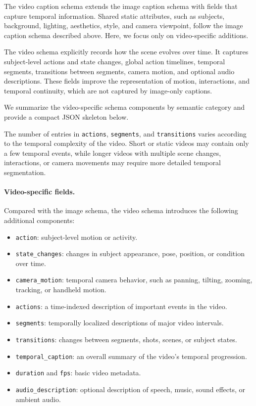 The video caption schema extends the image caption schema with fields that capture temporal information. Shared static attributes, such as subjects, background, lighting, aesthetics, style, and camera viewpoint, follow the image caption schema described above. Here, we focus only on video-specific additions.

The video schema explicitly records how the scene evolves over time. It captures subject-level actions and state changes, global action timelines, temporal segments, transitions between segments, camera motion, and optional audio descriptions. These fields improve the representation of motion, interactions, and temporal continuity, which are not captured by image-only captions.

We summarize the video-specific schema components by semantic category and provide a compact JSON skeleton below.



The number of entries in \texttt{actions}, \texttt{segments}, and \texttt{transitions} varies according to the temporal complexity of the video. Short or static videos may contain only a few temporal events, while longer videos with multiple scene changes, interactions, or camera movements may require more detailed temporal segmentation.

\paragraph{Video-specific fields.}
Compared with the image schema, the video schema introduces the following additional components:
\begin{itemize}
    \item \texttt{action}: subject-level motion or activity.
    \item \texttt{state\_changes}: changes in subject appearance, pose, position, or condition over time.
    \item \texttt{camera\_motion}: temporal camera behavior, such as panning, tilting, zooming, tracking, or handheld motion.
    \item \texttt{actions}: a time-indexed description of important events in the video.
    \item \texttt{segments}: temporally localized descriptions of major video intervals.
    \item \texttt{transitions}: changes between segments, shots, scenes, or subject states.
    \item \texttt{temporal\_caption}: an overall summary of the video’s temporal progression.
    \item \texttt{duration} and \texttt{fps}: basic video metadata.
    \item \texttt{audio\_description}: optional description of speech, music, sound effects, or ambient audio.
\end{itemize}

